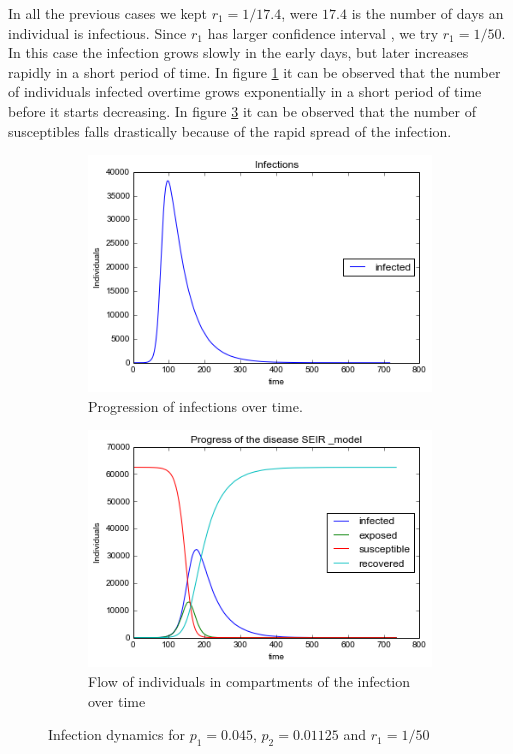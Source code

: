  In all the previous cases we kept $r_1 = 1/17.4$, were $17.4$ is the number of days an individual is infectious. Since  $r_1$ has larger confidence interval \citep{lessler2016times}, we try  $r_1 = 1/50$.  In this case the infection grows slowly in the early days, but later increases rapidly in a short period of time. In figure \ref{a51} it can be observed that the   number of individuals infected overtime grows exponentially in a short period of time before it starts decreasing. In figure \ref{a52} it can be observed that the number of susceptibles falls drastically because of the rapid spread of the infection.  

\begin{figure}[h!]
    \centering
    \begin{subfigure}[b]{0.45\textwidth}
        \includegraphics[width=\textwidth]{images/5infections}
        \caption{Progression of infections over time. }
        \label{a51}
    \end{subfigure}
     \begin{subfigure}[b]{0.45\textwidth}
        \includegraphics[width=\textwidth]{images/5SEIR}
        \caption{  Flow of individuals in compartments of the infection over time}
        \label{a52}
    \end{subfigure}
  \caption{Infection dynamics for $p_1 = 0.045 $, $p_2=0.01125$ and $r_1 = 1/50$ }
 \end{figure}

